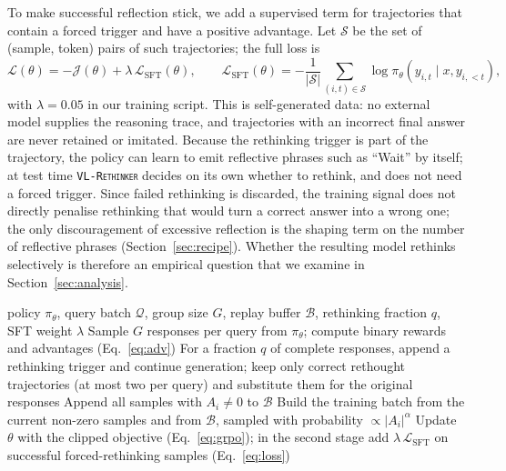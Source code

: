 \documentclass{article}
\newcommand{\model}{\texttt{\textsc{VL-Rethinker}}\xspace}
\begin{document}
To make successful reflection stick, we add a supervised term for trajectories that contain a forced trigger and have a positive advantage. Let $\mathcal{S}$ be the set of (sample, token) pairs of such trajectories; the full loss is
\begin{equation}
\mathcal{L}(\theta)=-\mathcal{J}(\theta)+\lambda\,\mathcal{L}_{\text{SFT}}(\theta),\qquad
\mathcal{L}_{\text{SFT}}(\theta)=-\frac{1}{|\mathcal{S}|}\sum_{(i,t)\in\mathcal{S}}\log\pi_\theta(y_{i,t}\mid x,y_{i,<t}),
\label{eq:loss}
\end{equation}
with $\lambda=0.05$ in our training script. This is self-generated data: no external model supplies the reasoning trace, and trajectories with an incorrect final answer are never retained or imitated. Because the rethinking trigger is part of the trajectory, the policy can learn to emit reflective phrases such as ``Wait'' by itself; at test time \model decides on its own whether to rethink, and does not need a forced trigger. Since failed rethinking is discarded, the training signal does not directly penalise rethinking that would turn a correct answer into a wrong one; the only discouragement of excessive reflection is the shaping term on the number of reflective phrases (Section~\ref{sec:recipe}). Whether the resulting model rethinks selectively is therefore an empirical question that we examine in Section~\ref{sec:analysis}.

\begin{algorithm}[t]
\caption{Training of \model (one iteration)}
\label{alg:vlrethinker}
\begin{algorithmic}[1]
\Require policy $\pi_\theta$, query batch $\mathcal{Q}$, group size $G$, replay buffer $\mathcal{B}$, rethinking fraction $q$, SFT weight $\lambda$
\State Sample $G$ responses per query from $\pi_\theta$; compute binary rewards and advantages (Eq.~\ref{eq:adv})
  \State For a fraction $q$ of complete responses, append a rethinking trigger and continue generation; keep only correct rethought trajectories (at most two per query) and substitute them for the original responses
\EndIf
\State Append all samples with $A_i\neq 0$ to $\mathcal{B}$
\State Build the training batch from the current non-zero samples and from $\mathcal{B}$, sampled with probability $\propto |A_i|^{\alpha}$
\State Update $\theta$ with the clipped objective (Eq.~\ref{eq:grpo}); in the second stage add $\lambda\,\mathcal{L}_{\text{SFT}}$ on successful forced-rethinking samples (Eq.~\ref{eq:loss})
\end{algorithmic}
\end{algorithm}
\end{document}
